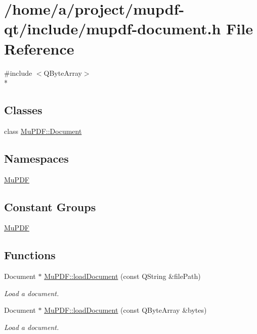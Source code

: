 \hypertarget{mupdf-document_8h}{\section{/home/a/project/mupdf-\/qt/include/mupdf-\/document.h File Reference}
\label{mupdf-document_8h}
}
{\ttfamily \#include $<$Q\-Byte\-Array$>$}\\*
\subsection*{Classes}
\begin{DoxyCompactItemize}
\item 
class \hyperlink{class_mu_p_d_f_1_1_document}{Mu\-P\-D\-F\-::\-Document}
\end{DoxyCompactItemize}
\subsection*{Namespaces}
\begin{DoxyCompactItemize}
\item 
\hyperlink{namespace_mu_p_d_f}{Mu\-P\-D\-F}
\end{DoxyCompactItemize}
\subsection*{Constant Groups}
\begin{DoxyCompactItemize}
\item 
\hyperlink{namespace_mu_p_d_f}{Mu\-P\-D\-F}
\end{DoxyCompactItemize}
\subsection*{Functions}
\begin{DoxyCompactItemize}
\item 
Document $\ast$ \hyperlink{namespace_mu_p_d_f_a5cf746094bc9648aca0d4a83e3ac44b3}{Mu\-P\-D\-F\-::load\-Document} (const Q\-String \&file\-Path)
\begin{DoxyCompactList}\small\item\em Load a document. \end{DoxyCompactList}\item 
Document $\ast$ \hyperlink{namespace_mu_p_d_f_a294a09188a3dcab290679752dfc8d52b}{Mu\-P\-D\-F\-::load\-Document} (const Q\-Byte\-Array \&bytes)
\begin{DoxyCompactList}\small\item\em Load a document. \end{DoxyCompactList}\end{DoxyCompactItemize}

